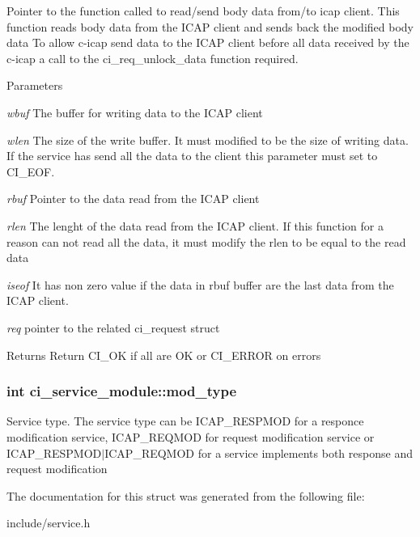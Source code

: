 Pointer to the function called to read/send body data from/to icap client. This function reads body data from the ICAP client and sends back the modified body data To allow c-\/icap send data to the ICAP client before all data received by the c-\/icap a call to the ci\_\-req\_\-unlock\_\-data function required. 
\begin{DoxyParams}{Parameters}
\item[{\em wbuf}]The buffer for writing data to the ICAP client \item[{\em wlen}]The size of the write buffer. It must modified to be the size of writing data. If the service has send all the data to the client this parameter must set to CI\_\-EOF. \item[{\em rbuf}]Pointer to the data read from the ICAP client \item[{\em rlen}]The lenght of the data read from the ICAP client. If this function for a reason can not read all the data, it must modify the rlen to be equal to the read data \item[{\em iseof}]It has non zero value if the data in rbuf buffer are the last data from the ICAP client. \item[{\em req}]pointer to the related ci\_\-request struct \end{DoxyParams}
\begin{DoxyReturn}{Returns}
Return CI\_\-OK if all are OK or CI\_\-ERROR on errors 
\end{DoxyReturn}
\hypertarget{structci__service__module_a0d5dacfa1b760c7fab9dce70ce8d2703}{
\subsubsection[{mod\_\-type}]{\setlength{\rightskip}{0pt plus 5cm}int {\bf ci\_\-service\_\-module::mod\_\-type}}}
\label{structci__service__module_a0d5dacfa1b760c7fab9dce70ce8d2703}


Service type. The service type can be ICAP\_\-RESPMOD for a responce modification service, ICAP\_\-REQMOD for request modification service or ICAP\_\-RESPMOD$|$ICAP\_\-REQMOD for a service implements both response and request modification 

The documentation for this struct was generated from the following file:\begin{DoxyCompactItemize}
\item 
include/service.h\end{DoxyCompactItemize}
